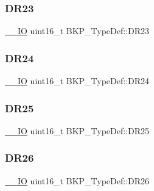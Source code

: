 \mbox{\label{struct_b_k_p___type_def_a81ae6732bea9b86ebdad14e13e2fafcf}} 
\subsubsection{\texorpdfstring{DR23}{DR23}}
{\footnotesize\ttfamily \mbox{\hyperlink{group___c_m_s_i_s___c_m3__core__definitions_gaec43007d9998a0a0e01faede4133d6be}{\+\_\+\+\_\+\+IO}} uint16\+\_\+t B\+K\+P\+\_\+\+Type\+Def\+::\+D\+R23}

\mbox{\label{struct_b_k_p___type_def_ad3797fc4d32046aef5680ddd0d890368}} 
\subsubsection{\texorpdfstring{DR24}{DR24}}
{\footnotesize\ttfamily \mbox{\hyperlink{group___c_m_s_i_s___c_m3__core__definitions_gaec43007d9998a0a0e01faede4133d6be}{\+\_\+\+\_\+\+IO}} uint16\+\_\+t B\+K\+P\+\_\+\+Type\+Def\+::\+D\+R24}

\mbox{\label{struct_b_k_p___type_def_a26779c5c85be6c3a5ea219c980be4ae2}} 
\subsubsection{\texorpdfstring{DR25}{DR25}}
{\footnotesize\ttfamily \mbox{\hyperlink{group___c_m_s_i_s___c_m3__core__definitions_gaec43007d9998a0a0e01faede4133d6be}{\+\_\+\+\_\+\+IO}} uint16\+\_\+t B\+K\+P\+\_\+\+Type\+Def\+::\+D\+R25}

\mbox{\label{struct_b_k_p___type_def_a04dc1fb867bdaa735d2036ac584f541b}} 
\subsubsection{\texorpdfstring{DR26}{DR26}}
{\footnotesize\ttfamily \mbox{\hyperlink{group___c_m_s_i_s___c_m3__core__definitions_gaec43007d9998a0a0e01faede4133d6be}{\+\_\+\+\_\+\+IO}} uint16\+\_\+t B\+K\+P\+\_\+\+Type\+Def\+::\+D\+R26}

